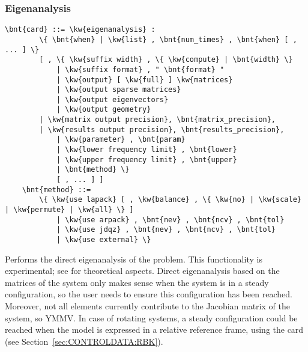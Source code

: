 \subsubsection{Eigenanalysis}
\label{sec:IVP:eigenanalysis}
\begin{Verbatim}[commandchars=\\\{\}]
    \bnt{card} ::= \kw{eigenanalysis} :
        \{ \bnt{when} | \kw{list} , \bnt{num_times} , \bnt{when} [ , ... ] \}
        [ , \{ \kw{suffix width} , \{ \kw{compute} | \bnt{width} \}
            | \kw{suffix format} , " \bnt{format} "
            | \kw{output} [ \kw{full} ] \kw{matrices}
            | \kw{output sparse matrices}
            | \kw{output eigenvectors}
            | \kw{output geometry}
	    | \kw{matrix output precision}, \bnt{matrix_precision},
	    | \kw{results output precision}, \bnt{results_precision},
            | \kw{parameter} , \bnt{param}
            | \kw{lower frequency limit} , \bnt{lower}
            | \kw{upper frequency limit} , \bnt{upper}
            | \bnt{method} \}
            [ , ... ] ]
    \bnt{method} ::=
        \{ \kw{use lapack} [ , \kw{balance} , \{ \kw{no} | \kw{scale} | \kw{permute} | \kw{all} \} ]
            | \kw{use arpack} , \bnt{nev} , \bnt{ncv} , \bnt{tol}
            | \kw{use jdqz} , \bnt{nev} , \bnt{ncv} , \bnt{tol}
            | \kw{use external} \} 
\end{Verbatim}
Performs the direct eigenanalysis of the problem.
This functionality is experimental;
see \cite{MASARATI-2009} for theoretical aspects.
Direct eigenanalysis based on the matrices of the system
only makes sense when the system is in a steady configuration,
so the user needs to ensure this configuration has been reached.
Moreover, not all elements currently contribute to the Jacobian
matrix of the system, so YMMV.
In case of rotating systems, a steady configuration could be reached
when the model is expressed in a relative reference frame,
using the  card
(see Section~\ref{sec:CONTROLDATA:RBK}).


